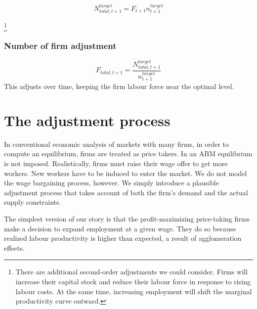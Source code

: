 \begin{equation}
N_{total,t+1}^{target} = F_{t+1}n^{target}_{t+1}\end{equation}  





\footnote{There are additional second-order adjustments we could consider. Firms will increase their capital stock and reduce their labour force in response to rising labour costs. At the same time, increasing employment will shift the marginal productivity curve outward.}


\subsubsection{Number of firm adjustment} 
\begin{equation}
F_{total, t+1}=\frac{N_{total,t+1}^{target}}{n^{target}_{t+1}}
\end{equation}
This adjusts over time, keeping the firm labour force near the optimal level. 

\section{The adjustment process}
In conventional economic analysis of markets with many firms, in order to compute an equilibrium, firms are treated as price takers. In an ABM equilibrium is not imposed. Realistically, firms must raise their wage offer to get more workers. New workers have to be induced to enter the market. We do not model the wage bargaining process, however. We simply introduce a plausible adjustment process that takes account of both the firm's demand and the actual supply constraints.  


The simplest version of our story is that the profit-maximizing price-taking firms make a decision to expand employment at a given wage. They do so because realized labour productivity is higher than expected,  a result of agglomeration effects.

